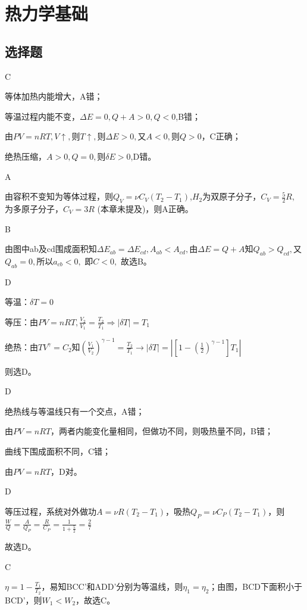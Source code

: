 \documentclass[b5paper,opensource]{./template/qyxf-book}
\begin{document}
\setcounter{chapter}{11}
\chapter{热力学基础}
\section{选择题}
C

\solve 
等体加热内能增大，A错；

等温过程内能不变，$\Delta E = 0,Q+A>0,Q<0$,B错；

由$PV=nRT,V \uparrow ,$则$ T \uparrow,$则$\Delta E > 0,$又$A<0,$则$Q>0$，C正确；

绝热压缩，$A>0,Q=0,$则$\delta E>0$,D错。

A

\solve 
由容积不变知为等体过程，则${Q_V} = \nu {C_V}({T_2} - {T_1})$,$H_2$为双原子分子，${C_V} = \frac{5}{2}R,$ 为多原子分子，$C_V=3R$ (本章未提及)，则A正确。


B

\solve 由图中ab及cd围成面积知$\Delta {E_{ab}} = \Delta {E_{cd}},A_{ab} < {A_{cd}},$由$\Delta E = Q + A$知$Q_{ab} > {Q_{cd}},$又${Q_{ab}} = 0,$所以${a_{cb}} < 0,$  即$C < 0,$ 故选B。


D

\solve 等温：$\delta T=0$

等压：由$PV=nRT,\frac{V_2}{V_1}=\frac{T_2}{T_1} \Rightarrow |\delta T|=T_1$

绝热：由$TV^\gamma=C_2$知$(\frac{V_1}{V_2})^{\gamma-1}=\frac{T_2}{T_1}\rightarrow |\delta T|=|[1-(\frac{1}{2})^{\gamma-1}]T_1|$

则选D。

D

\solve 绝热线与等温线只有一个交点，A错；

由$PV=nRT$，两者内能变化量相同，但做功不同，则吸热量不同，B错；

曲线下围成面积不同，C错；

由$PV=nRT$，D对。

D

\solve 等压过程，系统对外做功$A=\nu R(T_2-T_1)$，吸热$Q_P=\nu C_P(T_2-T_1)$，则$\frac{W}{Q}=\frac{A}{Q_P}=\frac{R}{C_P}=\frac{1}{1+\frac{5}{2}}=\frac{2}{7}$

故选D。

C

\solve $\eta=1-\frac{T_1}{T_2}$，易知BCC'和ADD'分别为等温线，则$\eta_1=\eta_2$；由图，BCD下面积小于BCD'，则$W_1<W_2$，故选C。
\end{document}
